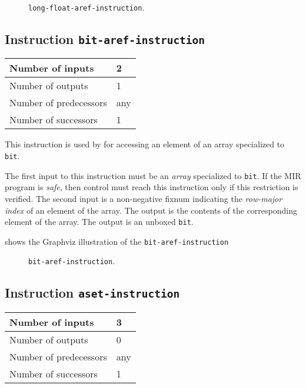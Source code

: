 \begin{figure}
\begin{center}
\end{center}
\caption{\label{fig-long-float-aref-instruction}
\texttt{long-float-aref-instruction}.}
\end{figure}

\subsection{Instruction \texttt{bit-aref-instruction}}
\label{mir-instruction-bit-aref}

\begin{tabular}{|l|l|}
\hline
Number of inputs & 2\\
\hline
Number of outputs & 1\\
\hline
Number of predecessors & any\\
\hline
Number of successors & 1\\
\hline
\end{tabular}

This instruction is used by for accessing an element of an array
specialized to \texttt{bit}.

The first input to this instruction must be an \emph{array}
specialized to \texttt{bit}.  If the MIR program is
\emph{safe}, then control must reach this instruction only if this
restriction is verified.  The second input is a non-negative fixnum
indicating the \emph{row-major index} of an element of the array.  The
output is the contents of the corresponding element of the array.  The
output is an unboxed \texttt{bit}.

 shows the Graphviz illustration of the
\texttt{bit-aref-instruction}

\begin{figure}
\begin{center}
\end{center}
\caption{\label{fig-bit-aref-instruction}
\texttt{bit-aref-instruction}.}
\end{figure}

\subsection{Instruction \texttt{aset-instruction}}
\label{mir-instruction-aset}

\begin{tabular}{|l|l|}
\hline
Number of inputs & 3\\
\hline
Number of outputs & 0\\
\hline
Number of predecessors & any\\
\hline
Number of successors & 1\\
\hline
\end{tabular}

